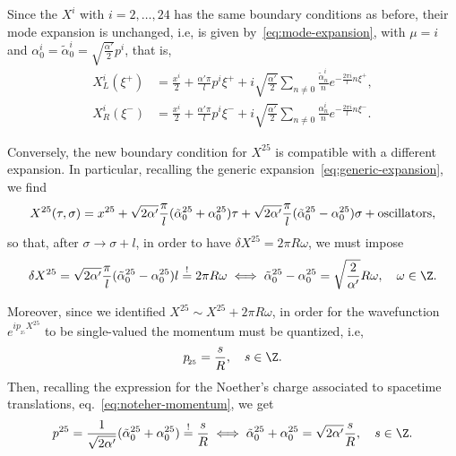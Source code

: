Since the $X^i$ with $i= 2, \dots, 24$ has the same boundary conditions as before, their mode expansion is unchanged, i.e, is given by~\eqref{eq:mode-expansion}, with $\mu = i$ and $\alpha^i_0 = \tilde{\alpha}^i_0 = \sqrt{\frac{\alpha'}{2}}p^i$, that is,
\begin{subequations}\label{eq:lightcone-mode-decomposition}
\begin{align}
    X^i_L(\xi^+) &= \frac{x^i}{2} + \frac{\alpha'\pi}{l} p^i \xi^+ + i \sqrt{\frac{\alpha'}{2}} \sum_{n\neq 0} \frac{\tilde{\alpha}^i_n}{n}e^{-\frac{2\pi i}{l}n \xi^+}, \\
    X^i_R(\xi^-) &= \frac{x^i}{2} + \frac{\alpha'\pi}{l} p^i \xi^- + i \sqrt{\frac{\alpha'}{2}} \sum_{n\neq 0} \frac{{\alpha}^i_n}{n}e^{-\frac{2\pi i}{l}n \xi^-} .
\end{align}
\end{subequations}

Conversely, the new boundary condition for $X^{25}$ is compatible with a different expansion. In particular, recalling the generic expansion~\eqref{eq:generic-expansion}, we find
\begin{equation}
    X^{25} (\tau,\sigma) = x^{25} + \sqrt{2\alpha'} \frac{\pi}{l} (\tilde{\alpha}^{25}_0 + \alpha^{25}_0) \tau + \sqrt{2\alpha'} \frac{\pi}{l} (\tilde{\alpha}^{25}_0 - \alpha^{25}_0) \sigma + \textup{oscillators},
\end{equation}
so that, after $\sigma \to \sigma + l$, in order to have $\delta X^{25} = 2\pi R \omega$, we must impose
\begin{equation}\label{eq:equation1}
    \delta X^{25} = \sqrt{2\alpha'} \frac{\pi}{l} (\tilde{\alpha}^{25}_0 - \alpha^{25}_0) l \overset{\mathrm{!}}{=} 2 \pi R \omega \iff \tilde{\alpha}^{25}_0 - \alpha^{25}_0 = \sqrt{\frac{2}{\alpha'}} R \omega, \quad \omega \in \Z.
\end{equation}

Moreover, since we identified $X^{25} \sim X^{25} + 2 \pi R \omega$, in order for the wavefunction $e^{ip_{\!_{25}}X^{25}}$ to be single-valued the momentum must be quantized, i.e,
\begin{equation}
    p_{\!_{25}} = \frac{s}{R}, \quad s \in \Z.
\end{equation}
Then, recalling the expression for the Noether's charge associated to spacetime translations, eq.~\eqref{eq:noteher-momentum}, we get
\begin{equation}\label{eq:equation2}
    p^{25} = \frac{1}{\sqrt{2\alpha'}}(\tilde{\alpha}^{25}_0 + \alpha^{25}_0) \overset{\mathrm{!}}{=} \frac{s}{R} \iff \tilde{\alpha}^{25}_0 + \alpha^{25}_0 = \sqrt{2\alpha'} \frac{s}{R}, \quad s \in \Z.
\end{equation}

